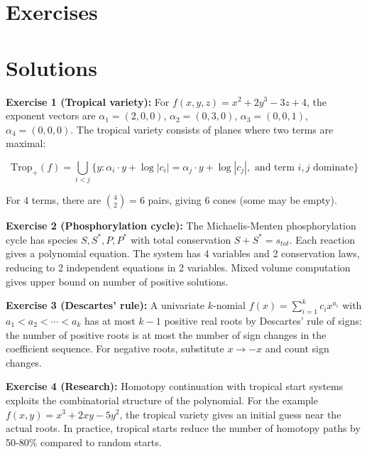 \section{Exercises}
\section{Solutions}
\label{sec:few:solutions}

\begin{solution}
\textbf{Exercise 1 (Tropical variety):} For $f(x,y,z) = x^2 + 2y^3 - 3z + 4$, the exponent vectors are $\alpha_1 = (2,0,0)$, $\alpha_2 = (0,3,0)$, $\alpha_3 = (0,0,1)$, $\alpha_4 = (0,0,0)$. The tropical variety consists of planes where two terms are maximal:

$$\text{Trop}_+(f) = \bigcup_{i<j} \{y : \alpha_i \cdot y + \log|c_i| = \alpha_j \cdot y + \log|c_j|, \text{ and term } i,j \text{ dominate}\}$$

For 4 terms, there are $\binom{4}{2} = 6$ pairs, giving 6 cones (some may be empty).
\end{solution}

\begin{solution}
\textbf{Exercise 2 (Phosphorylation cycle):} The Michaelis-Menten phosphorylation cycle has species $S, S^*, P, P^*$ with total conservation $S + S^* = s_{tot}$. Each reaction gives a polynomial equation. The system has 4 variables and 2 conservation laws, reducing to 2 independent equations in 2 variables. Mixed volume computation gives upper bound on number of positive solutions.
\end{solution}

\begin{solution}
\textbf{Exercise 3 (Descartes' rule):} A univariate $k$-nomial $f(x) = \sum_{i=1}^k c_i x^{a_i}$ with $a_1 < a_2 < \cdots < a_k$ has at most $k-1$ positive real roots by Descartes' rule of signs: the number of positive roots is at most the number of sign changes in the coefficient sequence. For negative roots, substitute $x \to -x$ and count sign changes.
\end{solution}

\begin{solution}
\textbf{Exercise 4 (Research):} Homotopy continuation with tropical start systems exploits the combinatorial structure of the polynomial. For the example $f(x,y) = x^3 + 2xy - 5y^2$, the tropical variety gives an initial guess near the actual roots. In practice, tropical starts reduce the number of homotopy paths by 50-80\% compared to random starts.
\end{solution}

